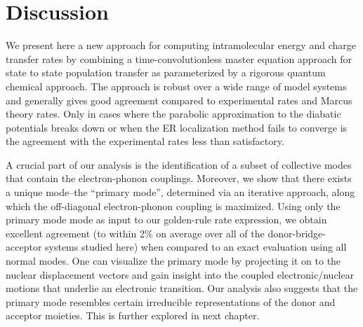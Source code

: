 \section{Discussion}

We present here a new approach for computing intramolecular energy and charge transfer rates
by combining a time-convolutionless master equation approach for state to state population transfer as parameterized
by  a rigorous quantum chemical approach.   The approach is robust over a wide range of model systems and
generally gives good agreement compared to experimental rates and Marcus theory rates.
Only in cases where the parabolic approximation to the diabatic potentials breaks down or when the ER localization method
fails to converge is the agreement with the experimental rates less than satisfactory.

A crucial part of our analysis is the identification of a subset of collective modes that contain
the electron-phonon couplings.  Moreover, we show that there exists a unique mode--the ``primary mode'',
determined via an iterative
approach, along which  the off-diagonal electron-phonon coupling is maximized.   Using only the primary mode
mode as input to our golden-rule rate expression, we obtain excellent
agreement (to within 2\% on average over   all of the donor-bridge-acceptor systems studied here)
when compared to an exact evaluation using all normal modes.   One can visualize the primary mode by projecting it on to the
nuclear displacement vectors and gain insight into the coupled electronic/nuclear motions that underlie an electronic
transition.   Our analysis also suggests that the primary  mode resembles certain  irreducible representations of the
donor and acceptor moieties. This is further explored in next chapter.

% 
% 






